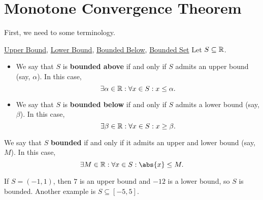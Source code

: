 \section{Monotone Convergence Theorem}
First, we need to some terminology.
\begin{Definition}{
        \href{https://proofwiki.org/wiki/Definition:Upper_Bound_of_Set/Real_Numbers}{Upper Bound},
        \href{https://proofwiki.org/wiki/Definition:Lower_Bound_of_Set/Real_Numbers}{Lower Bound},
        \href{https://proofwiki.org/wiki/Definition:Bounded_Below_Set/Real_Numbers\#Definition}{Bounded Below},
        \href{https://proofwiki.org/wiki/Definition:Bounded_Set/Real_Numbers}{Bounded Set}}
    {}
    Let $ S\subseteq \mathbb{R} $.\smallskip

    \begin{itemize}
        \item We say that $ S $ is \textbf{bounded above} if and only if $ S $ admits an upper bound (say, $ \alpha $).
              In this case,
              \[ \exists \alpha\in\mathbb{R}:\forall x\in S:x\le \alpha. \]
        \item We say that $ S $ is \textbf{bounded below} if and only if $ S $ admits a lower bound (say, $ \beta $).
              In this case,
              \[ \exists \beta\in\mathbb{R}:\forall x\in S:x\ge \beta. \]
    \end{itemize}
    We say that $ S $ \textbf{bounded} if and only if it admits an upper and lower bound (say, $ M $). In this case,
    \[ \exists M\in\R:\forall x\in S:\abs{x}\le M. \]
\end{Definition}
\begin{Example}{}{}
    If $ S=(-1,1) $, then $ 7 $ is an upper bound and $ -12 $
    is a lower bound, so $ S $ is bounded. Another example
    is $ S\subseteq[-5,5] $.
\end{Example}
